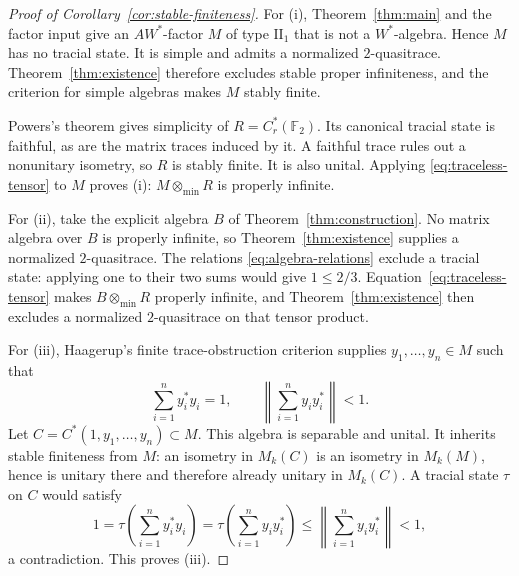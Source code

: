 \begin{proof}[Proof of Corollary~\ref{cor:stable-finiteness}]
For (i), Theorem~\ref{thm:main} and the factor input give an
\(AW^*\)-factor \(M\) of type \(\mathrm{II}_1\) that is not a
\(W^*\)-algebra. Hence \(M\) has no tracial state. It is simple and
admits a normalized \(2\)-quasitrace. Theorem~\ref{thm:existence}
therefore excludes stable proper infiniteness, and the criterion for
simple algebras makes \(M\) stably finite.

Powers's theorem \cite{Powers} gives simplicity of
\(R=C_r^*(\mathbb F_2)\). Its canonical tracial state is faithful, as
are the matrix traces induced by it. A faithful trace rules out a
nonunitary isometry, so \(R\) is stably finite. It is also unital.
Applying \eqref{eq:traceless-tensor} to \(M\) proves (i):
\(M\otimes_{\min}R\) is properly infinite.

For (ii), take the explicit algebra \(B\) of
Theorem~\ref{thm:construction}. No matrix algebra over \(B\) is properly
infinite, so Theorem~\ref{thm:existence} supplies a normalized
\(2\)-quasitrace. The relations \eqref{eq:algebra-relations} exclude a
tracial state: applying one to their two sums would give \(1\le2/3\).
Equation~\eqref{eq:traceless-tensor} makes
\(B\otimes_{\min}R\) properly infinite, and
Theorem~\ref{thm:existence} then excludes a normalized \(2\)-quasitrace
on that tensor product.

For (iii), Haagerup's finite trace-obstruction criterion
\cite[Lemma~2.1]{Haagerup} supplies \(y_1,\ldots,y_n\in M\) such that
\[
 \sum_{i=1}^n y_i^*y_i=1,
 \qquad
 \left\|\sum_{i=1}^n y_iy_i^*\right\|<1.
\]
Let \(C=C^*(1,y_1,\ldots,y_n)\subset M\). This algebra is separable and
unital. It inherits stable finiteness from \(M\): an isometry in
\(M_k(C)\) is an isometry in \(M_k(M)\), hence is unitary there and
therefore already unitary in \(M_k(C)\). A tracial state \(\tau\) on
\(C\) would satisfy
\[
 1=\tau\left(\sum_{i=1}^n y_i^*y_i\right)
  =\tau\left(\sum_{i=1}^n y_iy_i^*\right)
  \le\left\|\sum_{i=1}^n y_iy_i^*\right\|<1,
\]
a contradiction. This proves (iii).
\end{proof}
